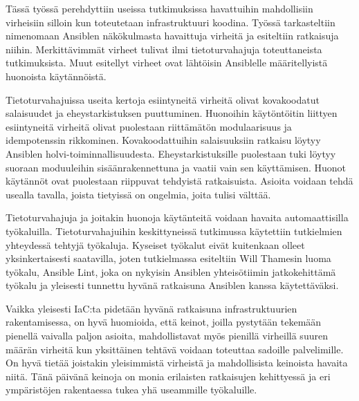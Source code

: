 Tässä työssä perehdyttiin useissa tutkimuksissa havattuihin mahdollisiin
virheisiin silloin kun toteutetaan infrastruktuuri koodina. Työssä tarkasteltiin
nimenomaan Ansiblen näkökulmasta havaittuja virheitä ja esiteltiin ratkaisuja
niihin. Merkittävimmät virheet tulivat ilmi tietoturvahajuja toteuttaneista
tutkimuksista. Muut esitellyt virheet ovat lähtöisin Ansiblelle määritellyistä
huonoista käytännöistä.

Tietoturvahajuissa useita kertoja esiintyneitä virheitä olivat kovakoodatut
salaisuudet ja eheystarkistuksen puuttuminen. Huonoihin käytöntöitin liittyen
esiintyneitä virheitä olivat puolestaan riittämätön modulaarisuus ja
idempotenssin rikkominen. Kovakoodattuihin salaisuuksiin ratkaisu löytyy
Ansiblen holvi-toiminnallisuudesta. Eheystarkistuksille puolestaan tuki
löytyy suoraan moduuleihin sisäänrakennettuna ja vaatii vain sen käyttämisen.
Huonot käytännöt ovat puolestaan riippuvat tehdyistä ratkaisuista. Asioita
voidaan tehdä usealla tavalla, joista tietyissä on ongelmia, joita tulisi välttää.

Tietoturvahajuja ja joitakin huonoja käytänteitä voidaan havaita
automaattisilla työkaluilla. Tietoturvahajuihin keskittyneissä tutkimussa
käytettiin tutkielmien yhteydessä tehtyjä työkaluja. Kyseiset työkalut eivät
kuitenkaan olleet yksinkertaisesti saatavilla, joten tutkielmassa esiteltiin
Will Thamesin luoma työkalu, Ansible Lint, joka on nykyisin Ansiblen yhteisötiimin
jatkokehittämä työkalu ja yleisesti tunnettu hyvänä ratkaisuna Ansiblen kanssa
käytettäväksi.

Vaikka yleisesti IaC:ta pidetään hyvänä ratkaisuna infrastruktuurien
rakentamisessa, on hyvä huomioida, että keinot, joilla pystytään tekemään
pienellä vaivalla paljon asioita, mahdollistavat myös pienillä virheillä
suuren määrän virheitä kun yksittäinen tehtävä voidaan toteuttaa sadoille
palvelimille. On hyvä tietää joistakin yleisimmistä virheistä ja mahdollisista
keinoista havaita niitä. Tänä päivänä keinoja on monia erilaisten ratkaisujen
kehittyessä ja eri ympäristöjen rakentaessa tukea yhä useammille työkaluille.
